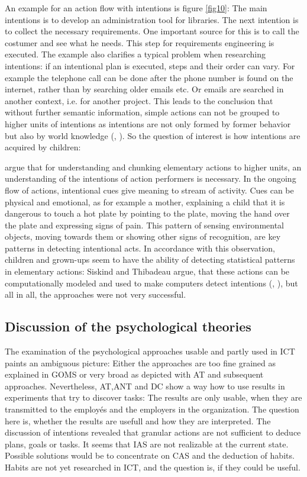 An example for an action flow with intentions is figure \ref{fig10}: The main intentions is to develop an administration tool for libraries. The next intention is to collect the necessary requirements. One important source for this is to call the costumer and see what he needs. This step for requirements engineering is executed. The example also clarifies a typical problem when researching intentions: if an intentional plan is executed, steps and their order can vary. For example the telephone call can be done after the phone number is found on the internet, rather than by searching older emails etc. Or emails are searched in another context, i.e. for another project. This leads to the conclusion that without further semantic information, simple actions can not be grouped to higher units of intentions as intentions are not only formed by former behavior but also by world knowledge (\cite{baldwin2001discerning}, \cite{bandura1977social}). So the question of interest is how intentions are acquired by children:

\cite{baldwin2001discerning} argue that for understanding and chunking elementary actions to higher units, an understanding of the intentions of action performers is necessary. In the ongoing flow of actions, intentional cues give meaning to stream of activity. Cues can be physical and emotional, as for example a mother, explaining a child that it is dangerous to touch a hot plate by pointing to the plate, moving the hand over the plate and expressing signs of pain. This pattern of sensing environmental objects, moving towards them or showing other signs of recognition, are key patterns in detecting intentional acts. 
In accordance with this observation, children and grown-ups seem to have the ability of detecting statistical patterns in elementary actions: Siskind and Thibadeau argue, that these actions can be computationally modeled and used to make computers detect intentions (\cite{thibadeau1986artificial}, \cite{siskind1995grounding}), but all in all, the approaches were not very successful. 

\subsection{Discussion of the psychological theories}
\label{discussionpsychology}
The examination of the psychological approaches usable and partly used in \ac{ICT} paints an ambiguous picture: Either the approaches are too fine grained as explained in \ac{GOMS} or very broad as depicted with \ac{AT} and subsequent approaches. Nevertheless, \ac{AT},\ac{ANT} and \ac{DC}  show a way how to use results in experiments that try to discover tasks: The results are only usable, when they are transmitted to the employés and the employers in the organization. The question here is, whether the results are usefull and how they are interpreted. The discussion of intentions revealed that granular actions are not sufficient to deduce plans, goals or tasks. It seems that \ac{IAS} are not realizable at the current state. Possible solutions would be to concentrate on \ac{CAS} and the deduction of habits. Habits are not yet researched in \ac{ICT}, and the question is, if they could be useful. 

